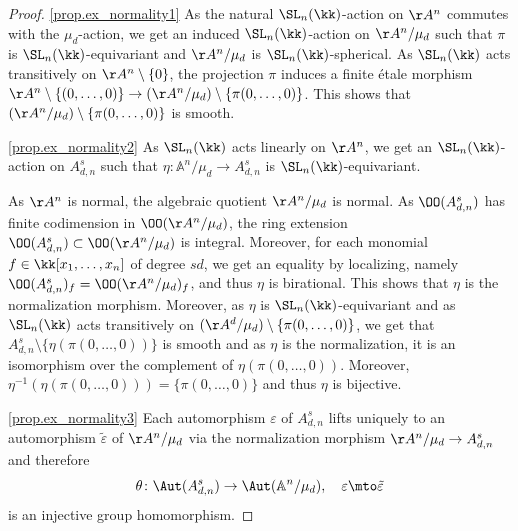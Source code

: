 \skpt
\begin{proof}
\eqref{prop.ex_normality1}
As the natural $\SL_n(\kk)$-action on $\AA^n$ commutes with the $\mu_d$-action,
we get an induced $\SL_n(\kk)$-action on $\AA^n / \mu_d$ such that $\pi$ is $\SL_n(\kk)$-equivariant
and $\AA^n / \mu_d$ is $\SL_n(\kk)$-spherical. As $\SL_n(\kk)$ acts transitively
on $\AA^n \setminus \{0\}$, the projection $\pi$ induces a finite étale morphism
$\AA^n \setminus \{(0, \ldots, 0)\} \to (\AA^n / \mu_d) \setminus \{\pi(0, \ldots, 0 )\}$. This shows
that $(\AA^n / \mu_d) \setminus \{\pi(0, \ldots, 0 )\}$ is smooth.

\eqref{prop.ex_normality2}
As $\SL_n(\kk)$ acts linearly on $\AA^n$, we get an $\SL_n(\kk)$-action on
$A_{d, n}^s$ such that $\eta \colon \mathbb{A}^n/\mu_d \to A_{d, n}^s$ is $\SL_n(\kk)$-equivariant.

As $\AA^n$ is normal, the algebraic quotient $\AA^n / \mu_d$ is normal.
As $\OO(A_{d, n}^s)$ has finite codimension in $\OO(\AA^n / \mu_d)$, the ring
extension $\OO(A_{d, n}^s) \subset \OO(\AA^n / \mu_d)$
is integral. Moreover, for each
monomial $f \in \kk[x_1, \ldots, x_n]$ of degree $sd$, we get an
equality by localizing, namely $\OO(A_{d, n}^s)_f = \OO(\AA^n / \mu_d)_f$, and thus $\eta$ is birational.
This shows that $\eta$ is the normalization morphism.
Moreover, as $\eta$ is $\SL_n(\kk)$-equivariant
and as $\SL_n(\kk)$ acts transitively on $(\AA^d / \mu_d) \setminus \{\pi(0, \ldots, 0)\}$, we get
that $A_{d, n}^s \setminus \{\eta(\pi(0, \ldots, 0))\}$ is smooth and as $\eta$ is the normalization,
it is an isomorphism over the complement of $\eta(\pi(0, \ldots, 0))$.
Moreover, $\eta^{-1}(\eta(\pi(0, \ldots, 0))) = \{\pi(0, \ldots, 0)\}$ and thus $\eta$ is bijective.

\eqref{prop.ex_normality3}
Each automorphism $\varepsilon$ of $A_{d, n}^s$ lifts uniquely to an automorphism
$\tilde{\varepsilon}$ of $\AA^n / \mu_d$ via
the normalization morphism $\AA^n / \mu_d \to A_{d, n}^s$ and therefore
\[
\theta \colon \Aut(A_{d,n}^s) \to \Aut(\mathbb{A}^n/\mu_d), \quad\varepsilon \mto \tilde{\varepsilon}
\]
is an injective group homomorphism.


\end{proof}
